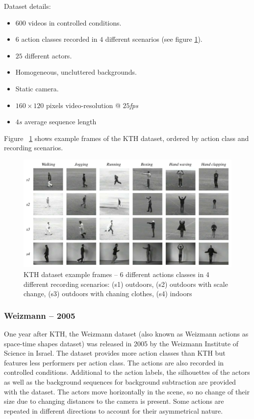 Dataset details: \cite{schuldt_recognizing_2004}
\begin{itemize}
    \item $600$ videos in controlled conditions.
    \item $6$ action classes recorded in $4$ different scenarios (see figure \ref{fig:kth_example}).
    \item $25$ different actors.
    \item Homogeneous, uncluttered backgrounds.
    \item Static camera.
    \item $160 \times 120$ pixels video-resolution @ $25$\textit{fps}
    \item $4s$ average sequence length
\end{itemize}

Figure ~\ref{fig:kth_example} shows example frames of the KTH dataset, ordered by action class and recording scenarios.

\begin{figure}[H]
    \centering
    \includegraphics[width=\textwidth]{img_datasets/kth_example}
    \caption{KTH dataset example frames -- 6 different actions classes in 4 different recording scenarios: (s1) outdoors, (s2) outdoors with scale change, (s3) outdoors with chaning clothes, (s4) indoors \cite{schuldt_recognizing_2004}}
    \label{fig:kth_example}
\end{figure}


\subsubsection{Weizmann -- 2005}
One year after KTH, the Weizmann dataset \cite{blank_actions_2005} (also known as Weizmann actions as space-time shapes dataset) was released in 2005 by the Weizmann Institute of Science in Israel.
The dataset provides more action classes than KTH but features less performers per action class.
The actions are also recorded in controlled conditions.
Additional to the action labels, the silhouettes of the actors as well as the background sequences for background subtraction are provided with the dataset.
The actors move horizontally in the scene, so no change of their size due to changing distances to the camera is present.
Some actions are repeated in different directions to account for their asymmetrical nature.

